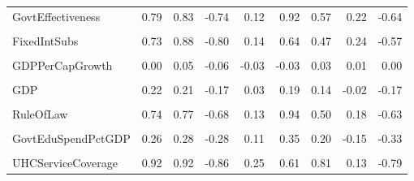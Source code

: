 \documentclass[
]{article}
\begin{document}
\begin{table}
{\begin{tabular}[t]{lrrrrrrrr}
GovtEffectiveness & 0.79 & 0.83 & -0.74 & 0.12 & 0.92 & 0.57 & 0.22 & -0.64\\
\cellcolor{gray!10}{ShippingIndex} & \cellcolor{gray!10}{0.46} & \cellcolor{gray!10}{0.46} & \cellcolor{gray!10}{-0.38} & \cellcolor{gray!10}{0.10} & \cellcolor{gray!10}{0.35} & \cellcolor{gray!10}{0.34} & \cellcolor{gray!10}{0.34} & \cellcolor{gray!10}{-0.36}\\
FixedIntSubs & 0.73 & 0.88 & -0.80 & 0.14 & 0.64 & 0.47 & 0.24 & -0.57\\
\cellcolor{gray!10}{InternetUsersPct} & \cellcolor{gray!10}{0.72} & \cellcolor{gray!10}{0.87} & \cellcolor{gray!10}{-0.82} & \cellcolor{gray!10}{0.29} & \cellcolor{gray!10}{0.56} & \cellcolor{gray!10}{0.55} & \cellcolor{gray!10}{0.15} & \cellcolor{gray!10}{-0.64}\\
\addlinespace
GDPPerCapGrowth & 0.00 & 0.05 & -0.06 & -0.03 & -0.03 & 0.03 & 0.01 & 0.00\\
\cellcolor{gray!10}{GDPGrowth} & \cellcolor{gray!10}{-0.12} & \cellcolor{gray!10}{-0.10} & \cellcolor{gray!10}{0.10} & \cellcolor{gray!10}{-0.07} & \cellcolor{gray!10}{-0.10} & \cellcolor{gray!10}{-0.09} & \cellcolor{gray!10}{0.00} & \cellcolor{gray!10}{0.12}\\
GDP & 0.22 & 0.21 & -0.17 & 0.03 & 0.19 & 0.14 & -0.02 & -0.17\\
\cellcolor{gray!10}{PoliticalStability} & \cellcolor{gray!10}{0.59} & \cellcolor{gray!10}{0.63} & \cellcolor{gray!10}{-0.58} & \cellcolor{gray!10}{0.10} & \cellcolor{gray!10}{0.75} & \cellcolor{gray!10}{0.41} & \cellcolor{gray!10}{0.14} & \cellcolor{gray!10}{-0.56}\\
RuleOfLaw & 0.74 & 0.77 & -0.68 & 0.13 & 0.94 & 0.50 & 0.18 & -0.63\\
\addlinespace
\cellcolor{gray!10}{RqdEduYears} & \cellcolor{gray!10}{0.41} & \cellcolor{gray!10}{0.39} & \cellcolor{gray!10}{-0.38} & \cellcolor{gray!10}{0.13} & \cellcolor{gray!10}{0.26} & \cellcolor{gray!10}{0.42} & \cellcolor{gray!10}{-0.01} & \cellcolor{gray!10}{-0.36}\\
GovtEduSpendPctGDP & 0.26 & 0.28 & -0.28 & 0.11 & 0.35 & 0.20 & -0.15 & -0.33\\
\cellcolor{gray!10}{MortalityFromDirtyness} & \cellcolor{gray!10}{-0.80} & \cellcolor{gray!10}{-0.79} & \cellcolor{gray!10}{0.80} & \cellcolor{gray!10}{0.15} & \cellcolor{gray!10}{-0.42} & \cellcolor{gray!10}{-0.82} & \cellcolor{gray!10}{-0.07} & \cellcolor{gray!10}{1.00}\\
UHCServiceCoverage & 0.92 & 0.92 & -0.86 & 0.25 & 0.61 & 0.81 & 0.13 & -0.79\\

\end{tabular}}
\end{table}
\end{document}
